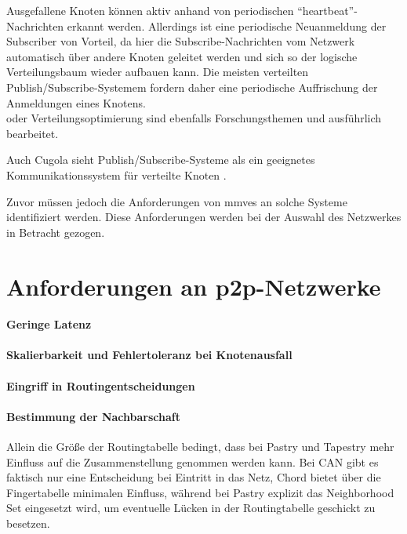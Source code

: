 Ausgefallene Knoten können aktiv anhand von periodischen \enquote{heartbeat}-Nachrichten erkannt werden. Allerdings ist eine periodische Neuanmeldung der Subscriber von Vorteil, da hier die Subscribe-Nachrichten vom Netzwerk automatisch über andere Knoten geleitet werden und sich so der logische Verteilungsbaum wieder aufbauen kann. Die meisten verteilten Publish/Subscribe-Systemem fordern daher eine periodische Auffrischung der Anmeldungen eines Knotens.\\

oder Verteilungsoptimierung \cite{Muhl2002LargeScale} sind ebenfalls Forschungsthemen und ausführlich bearbeitet.

Auch Cugola sieht Publish/Subscribe-Systeme als ein geeignetes Kommunikationssystem für verteilte Knoten \cite{Cugola2002Using}.


Zuvor müssen jedoch die Anforderungen von \acp{mmve} an solche Systeme identifiziert werden. Diese Anforderungen werden bei der Auswahl des Netzwerkes in Betracht gezogen.

\section{Anforderungen an p2p-Netzwerke}

\paragraph{Geringe Latenz} 

\paragraph{Skalierbarkeit und Fehlertoleranz bei Knotenausfall} 

\paragraph{Eingriff in Routingentscheidungen} 

\paragraph{Bestimmung der Nachbarschaft}
Allein die Größe der Routingtabelle bedingt, dass bei Pastry und Tapestry mehr Einfluss auf die Zusammenstellung genommen werden kann. Bei CAN gibt es faktisch nur eine Entscheidung bei Eintritt in das Netz, Chord bietet über die Fingertabelle minimalen Einfluss, während bei Pastry explizit das Neighborhood Set eingesetzt wird, um eventuelle Lücken in der Routingtabelle geschickt zu besetzen.
